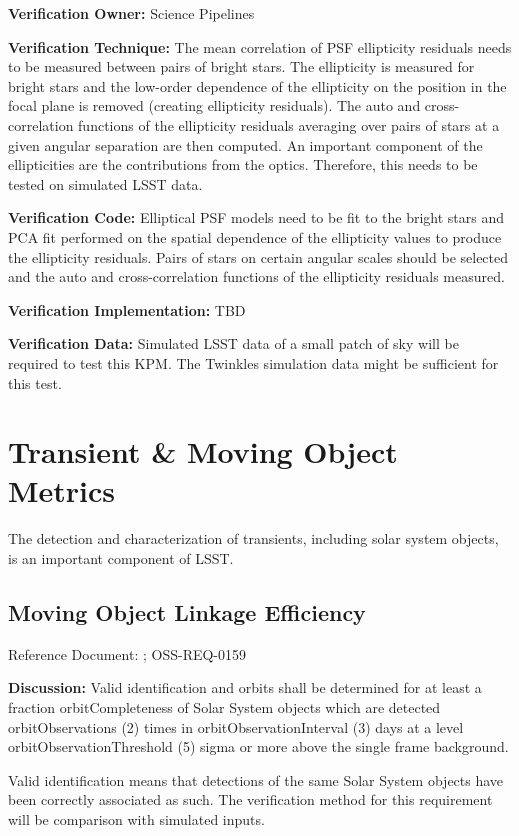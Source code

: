 \documentclass[DM,lsstdraft,toc]{lsstdoc}
\begin{document}
\textbf{Verification Owner:} Science Pipelines

\textbf{Verification Technique:} The mean correlation of PSF ellipticity
residuals needs to be measured between pairs of bright stars. The
ellipticity is measured for bright stars and the low-order dependence of
the ellipticity on the position in the focal plane is removed (creating
ellipticity residuals). The auto and cross-correlation functions of the
ellipticity residuals averaging over pairs of stars at a given angular
separation are then computed. An important component of the
ellipticities are the contributions from the optics. Therefore, this
needs to be tested on simulated LSST data.

\textbf{Verification Code:} Elliptical PSF models need to be fit to the
bright stars and PCA fit performed on the spatial dependence of the
ellipticity values to produce the ellipticity residuals. Pairs of stars
on certain angular scales should be selected and the auto and
cross-correlation functions of the ellipticity residuals measured.

\textbf{Verification Implementation:} TBD

\textbf{Verification Data:} Simulated LSST data of a small patch of sky
will be required to test this KPM. The Twinkles simulation data might be
sufficient for this test.

\section{Transient \& Moving Object
Metrics}\label{transient-moving-object-metrics}

The detection and characterization of transients, including solar system
objects, is an important component of LSST.

\subsection{Moving Object Linkage
Efficiency}\label{moving-object-linkage-efficiency}

Reference Document: ; OSS-REQ-0159

\textbf{Discussion:} Valid identification and orbits shall be determined
for at least a fraction orbitCompleteness of Solar System objects which
are detected orbitObservations (2) times in orbitObservationInterval (3)
days at a level orbitObservationThreshold (5) sigma or more above the
single frame background.

Valid identification means that detections of the same Solar System
objects have been correctly associated as such. The verification method
for this requirement will be comparison with simulated inputs.
\end{document}
